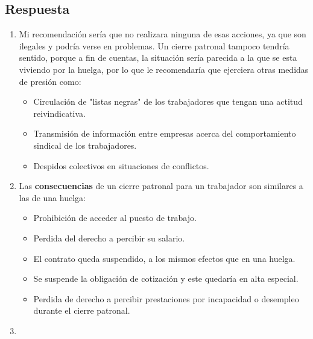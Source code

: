\subsection{Respuesta}

\begin{enumerate}
    \item Mi recomendación sería que no realizara ninguna de esas acciones, ya que son ilegales y podría verse en problemas. Un cierre patronal tampoco tendría sentido, porque a fin de cuentas, la situación sería parecida a la que se esta viviendo por la huelga, por lo que le recomendaría que ejerciera otras medidas de presión como:

    \begin{itemize}
        \item Circulación de "listas negras" de los trabajadores que tengan una actitud reivindicativa.
        \item Transmisión de información entre empresas acerca del comportamiento sindical de los trabajadores.
        \item Despidos colectivos en situaciones de conflictos.
    \end{itemize}

    \item Las \textbf{consecuencias} de un cierre patronal para un trabajador son similares a las de una huelga:
    \begin{itemize}
        \item Prohibición de acceder al puesto de trabajo.
        \item Perdida del derecho a percibir su salario.
        \item El contrato queda suspendido, a los mismos efectos que en una huelga.
        \item Se suspende la obligación de cotización y este quedaría en alta especial.
        \item Perdida de derecho a percibir prestaciones por incapacidad o desempleo durante el cierre patronal.
    \end{itemize}

    \item
\end{enumerate}










\newpage



